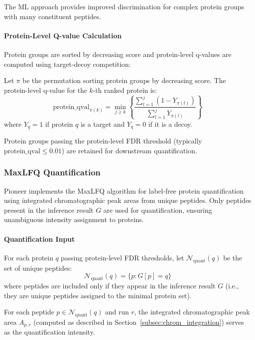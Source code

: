 \documentclass{article}
\begin{document}
The ML approach provides improved discrimination for complex protein groups with many constituent peptides.

\paragraph{Protein-Level Q-value Calculation} Protein groups are sorted by decreasing score and protein-level q-values are computed using target-decoy competition:

Let $\pi$ be the permutation sorting protein groups by decreasing score. The protein-level q-value for the $k$-th ranked protein is:
\begin{equation}
\text{protein\_qval}_{\pi(k)} = \min_{j \geq k} \left\{ \frac{\sum_{l=1}^{j} (1 - Y_{\pi(l)})}{\sum_{l=1}^{j} Y_{\pi(l)}} \right\}
\end{equation}
where $Y_q = 1$ if protein $q$ is a target and $Y_q = 0$ if it is a decoy.

Protein groups passing the protein-level FDR threshold (typically $\text{protein\_qval} \leq 0.01$) are retained for downstream quantification.

\subsubsection{MaxLFQ Quantification}

Pioneer implements the MaxLFQ algorithm \cite{Cox2014} for label-free protein quantification using integrated chromatographic peak areas from unique peptides. Only peptides present in the inference result $G$ are used for quantification, ensuring unambiguous intensity assignment to proteins.

\paragraph{Quantification Input} For each protein $q$ passing protein-level FDR thresholds, let $\mathcal{N}_{\text{quant}}(q)$ be the set of unique peptides:
\begin{equation}
\mathcal{N}_{\text{quant}}(q) = \{p : G[p] = q\}
\end{equation}
where peptides are included only if they appear in the inference result $G$ (i.e., they are unique peptides assigned to the minimal protein set).

For each peptide $p \in \mathcal{N}_{\text{quant}}(q)$ and run $r$, the integrated chromatographic peak area $A_{p,r}$ (computed as described in Section~\ref{subsec:chrom_integration}) serves as the quantification intensity.
\end{document}
